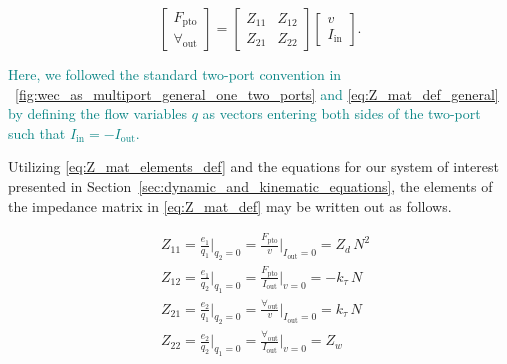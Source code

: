\documentclass[lettersize,journal]{IEEEtran}
\newcommand{\ak}[1]{\textcolor{teal}{#1}}
\begin{document}
\begin{equation}
        \label{eq:Z_mat_def}
        \begin{bmatrix} 
                F_{\textrm{pto}} \\
                \forall_{\textrm{out}} 
        \end{bmatrix} 
        = 
        \begin{bmatrix} 
                Z_{11} & Z_{12} \\ 
                Z_{21} & Z_{22} 
        \end{bmatrix} 
        \begin{bmatrix} 
                v \\
                I_{\textrm{in}} 
        \end{bmatrix} .
\end{equation}

\ak{Here, we followed the standard two-port convention in \figurename~\ref{fig:wec_as_multiport_general_one_two_ports} and \eqref{eq:Z_mat_def_general} by defining the flow variables $q$ as vectors entering both sides of the two-port such that $I_{\textrm{in}} = -I_{\textrm{out}}$.}

\noindent{} Utilizing \eqref{eq:Z_mat_elements_def} and the equations for our system of interest presented in Section~\ref{sec:dynamic_and_kinematic_equations}, the elements of the impedance matrix in \eqref{eq:Z_mat_def} may be written out as follows.

\begin{subequations}
        \begin{align}
                &Z_{11} = \frac{e_1}{q_1} \bigg \vert_{q_2=0} 
                = \frac{F_{\textrm{pto}}}{v} \bigg \vert_{I_{\textrm{out}}=0} = Z_d \, N^2 \\[0.5em]
                &Z_{12} = \frac{e_1}{q_2} \bigg \vert_{q_1=0} 
                = \frac{F_{\textrm{pto}}}{I_{\textrm{out}}} \bigg \vert_{v=0} = -k_\tau \, N \\[0.5em]
                &Z_{21} = \frac{e_2}{q_1} \bigg \vert_{q_2=0} 
                = \frac{\forall_{\textrm{out}}}{v} \bigg \vert_{I_{\textrm{out}}=0} = k_\tau \, N \\[0.5em]
                &Z_{22} = \frac{e_2}{q_2} \bigg \vert_{q_1=0} 
                = \frac{\forall_{\textrm{out}}}{I_{\textrm{out}}} \bigg \vert_{v=0} = Z_w 
        \end{align}
\end{subequations}
\end{document}
